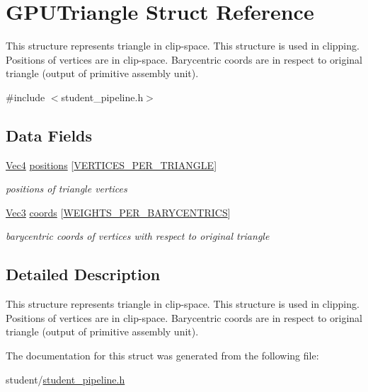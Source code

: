 \hypertarget{structGPUTriangle}{}\section{G\+P\+U\+Triangle Struct Reference}
\label{structGPUTriangle}


This structure represents triangle in clip-\/space. This structure is used in clipping. Positions of vertices are in clip-\/space. Barycentric coords are in respect to original triangle (output of primitive assembly unit).  




{\ttfamily \#include $<$student\+\_\+pipeline.\+h$>$}

\subsection*{Data Fields}
\begin{DoxyCompactItemize}
\item 
\hyperlink{structVec4}{Vec4} \hyperlink{structGPUTriangle_af33d9eb5648bd43a8098159cd0691bb1}{positions} \mbox{[}\hyperlink{fwd_8h_a67df0e09b776eea53360bcc8f4a82ac9}{V\+E\+R\+T\+I\+C\+E\+S\+\_\+\+P\+E\+R\+\_\+\+T\+R\+I\+A\+N\+G\+LE}\mbox{]}\hypertarget{structGPUTriangle_af33d9eb5648bd43a8098159cd0691bb1}{}\label{structGPUTriangle_af33d9eb5648bd43a8098159cd0691bb1}

\begin{DoxyCompactList}\small\item\em positions of triangle vertices \end{DoxyCompactList}\item 
\hyperlink{structVec3}{Vec3} \hyperlink{structGPUTriangle_a1cd3fe2c1979f844528481ee336d4e09}{coords} \mbox{[}\hyperlink{fwd_8h_a6142f59143b2049a17b5318e8655ac86}{W\+E\+I\+G\+H\+T\+S\+\_\+\+P\+E\+R\+\_\+\+B\+A\+R\+Y\+C\+E\+N\+T\+R\+I\+CS}\mbox{]}\hypertarget{structGPUTriangle_a1cd3fe2c1979f844528481ee336d4e09}{}\label{structGPUTriangle_a1cd3fe2c1979f844528481ee336d4e09}

\begin{DoxyCompactList}\small\item\em barycentric coords of vertices with respect to original triangle \end{DoxyCompactList}\end{DoxyCompactItemize}


\subsection{Detailed Description}
This structure represents triangle in clip-\/space. This structure is used in clipping. Positions of vertices are in clip-\/space. Barycentric coords are in respect to original triangle (output of primitive assembly unit). 

The documentation for this struct was generated from the following file\+:\begin{DoxyCompactItemize}
\item 
student/\hyperlink{student__pipeline_8h}{student\+\_\+pipeline.\+h}\end{DoxyCompactItemize}
